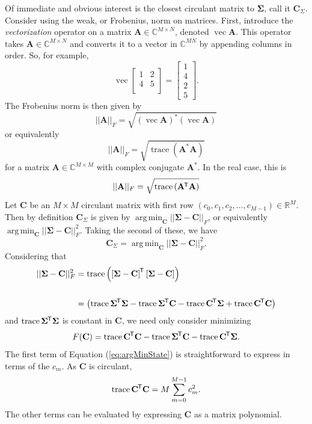 \documentclass[letterpaper,12pt,oneside,final]{article}
\newcommand{\m}[1]{\mathbf{#1}}               %
\newcommand{\sm}[1]{\boldsymbol{#1}}   %
\newcommand{\tr}[1]{{#1}^{\mkern-1.5mu\mathsf{T}}}              %
\newcommand{\conj}[1]{{#1}^{\ast}}
\newcommand{\norm}[1]{||{#1}||}              %
\newcommand{\frob}[1]{\norm{#1}_F}
\newcommand*{\mvec}{\operatorname{vec}}
\newcommand*{\trace}{\operatorname{trace}}
\DeclareMathOperator*{\argmin}{arg\,min}
\newcommand{\field}[1]{\mathbb{#1}}
\newcommand{\Reals}{\field{R}}
\newcommand{\Complex}{\field{C}}
\begin{document}
Of immediate and obvious interest is the closest circulant matrix to $\sm{\Sigma}$, call it $\m{C}_{\Sigma}$. Consider using the weak, or Frobenius, norm on matrices. First, introduce the \textit{vectorization} operator on a matrix $\m{A} \in \Complex^{M \times N}$, denoted $\mvec{\m{A}}$. This operator takes $\m{A} \in \Complex^{M \times N}$ and converts it to a vector in $\Complex^{MN}$ by appending columns in order. So, for example,
$$\mvec{\begin{bmatrix}
    1 & 2  \\
    4 & 5  \\
  \end{bmatrix}} =
\begin{bmatrix}
  1 \\ 4 \\ 2 \\ 5
  \end{bmatrix}.$$
The Frobenius norm is then given by
$$\frob{\m{A}} = \sqrt{\conj{(\mvec{\m{A}})} (\mvec{\m{A}})}$$
or equivalently
$$\frob{\m{A}} = \sqrt{\trace \left ( \conj{\m{A}} \m{A} \right )}$$
for a matrix $\m{A} \in \Complex^{M \times M}$ with complex conjugate $\conj{\m{A}}$. In the real case, this is
$$\frob{\m{A}} = \sqrt{\trace \left ( \tr{\m{A}} \m{A} \right )}$$
Let $\m{C}$ be an $M \times M$ circulant matrix with first row $( c_0, c_1, c_2, \dots, c_{M-1} ) \in \Reals^M$. Then by definition $\m{C}_{\Sigma}$ is given by $\argmin_{\m{C}} \frob{\sm{\Sigma} - \m{C}}$, or equivalently $\argmin_{\m{C}} \frob{\sm{\Sigma} - \m{C}}^2$. Taking the second of these, we have
\begin{equation} \label{eq:argMinDef}
  \m{C}_{\Sigma} = \argmin_{\m{C}} \frob{\sm{\Sigma} - \m{C}}^2.
\end{equation}
Considering that
\begin{equation*}
  \begin{split}
    \frob{\sm{\Sigma} - \m{C}}^2 & = \trace \left ( \tr{\left [ \sm{\Sigma} - \m{C} \right ]} \left [ \sm{\Sigma} - \m{C} \right ] \right ) \\
    & \\
    & = \left ( \trace \tr{\sm{\Sigma}} \sm{\Sigma} - \trace \tr{\sm{\Sigma}} \m{C} - \trace \tr{\m{C}} \sm{\Sigma} + \trace \tr{\m{C}} \m{C} \right )
  \end{split}
\end{equation*}
and $\trace \tr{\sm{\Sigma}} \sm{\Sigma}$ is constant in $\m{C}$, we need only consider minimizing
\begin{equation} \label{eq:argMinState}
  F(\m{C}) = \trace \tr{\m{C}} \m{C} - \trace \tr{\sm{\Sigma}} \m{C} - \trace \tr{\m{C}} \sm{\Sigma}.
\end{equation}
The first term of Equation (\ref{eq:argMinState}) is straightforward to express in terms of the $c_m$. As $\m{C}$ is circulant,
$$\trace \tr{\m{C}} \m{C} = M \sum_{m = 0}^{M-1} c_m^2.$$
The other terms can be evaluated by expressing $\m{C}$ as a matrix polynomial.
\end{document}
